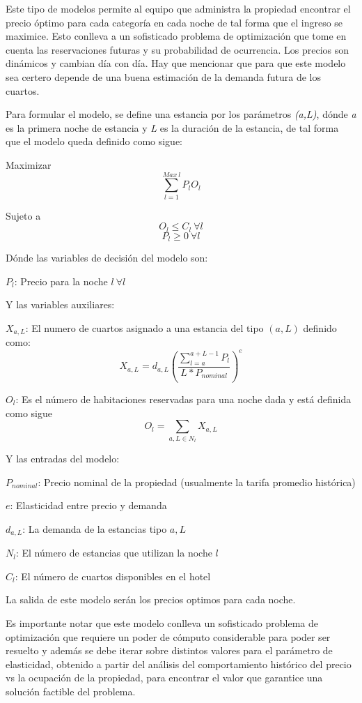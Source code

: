 {Este tipo de modelos permite al equipo que administra la propiedad encontrar el precio óptimo para cada categoría en cada noche de tal forma que el ingreso se maximice. Esto conlleva a un sofisticado problema de optimización que tome en cuenta las reservaciones futuras y su probabilidad de ocurrencia. Los precios son dinámicos y cambian día con día. Hay que mencionar que para que este modelo sea certero depende de una buena estimación de la demanda futura de los cuartos.

Para formular el modelo, se define una estancia por los parámetros \emph{(a,L)}, dónde \emph{a} es la primera noche de estancia y \emph{L} es la duración de la estancia, de tal forma que el modelo queda definido como sigue:

Maximizar $$\sum_{l=1}^{Max\ l} P_l O_l$$

Sujeto a $$O_l \leq C_l\  \forall l$$ $$P_l \geq 0 \ \forall l$$

Dónde las variables de decisión del modelo son:

$P_l$: Precio para la noche $l\ \forall l$

Y las variables auxiliares:

$X_{a,L}$: El numero de cuartos asignado a una estancia del tipo $(a,L)$ definido como: $$X_{a,L} = d_{a,L}(\frac{\sum_{l=a}^{a+L-1} P_l}{L*P_{nominal}})^e$$

$O_l$: Es el número de habitaciones reservadas para una noche dada y está definida como sigue $$O_l = \sum_{a,L\in N_l} X_{a,L}$$

Y las entradas del modelo:

$P_{nominal}$: Precio nominal de la propiedad (usualmente la tarifa promedio histórica)

$e$: Elasticidad entre precio y demanda

$d_{a,L}$: La demanda de la estancias tipo $a,L$

$N_l$: El número de estancias que utilizan la noche $l$

$C_l$: El número de cuartos disponibles en el hotel

La salida de este modelo serán los precios optimos para cada noche. 

Es importante notar que este modelo conlleva un sofisticado problema de optimización que requiere un poder de cómputo considerable para poder ser resuelto y además se debe iterar sobre distintos valores para el parámetro de elasticidad, obtenido a partir del análisis del comportamiento histórico del precio vs la ocupación de la propiedad, para encontrar el valor que garantice una solución factible del problema.



}
